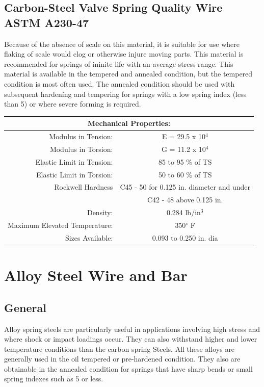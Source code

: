\documentclass[10pt]{article}
\begin{document}
\subsection{Carbon-Steel Valve Spring Quality Wire ASTM A230-47} %
Because of the absence of scale on this material, it is suitable for use where flaking of scale would clog or otherwise injure moving parts. 
This material is recommended for springs of ininite life with an average stress range. 
This material is available in the tempered and annealed condition, but the tempered condition is most often used. 
The annealed condition should be used with subsequent hardeníng and tempering for springs with a low spring index (less than 5) or where severe forming is required.

\begin{center}
\begin{tabular}{ r c }
\multicolumn{2}{c}{Mechanical Properties:} \\
\hline
Modulus in Tension: & E = 29.5 x 10$^4$ \\  
Modulus in Torsion: & G = 11.2 x 10$^4$ \\
Elastic Limit in Tension: & 85 to 95 \% of TS \\  
Elastic Limit in Torsion: & 50 to 60 \% of TS \\
Rockwell Hardness & C45 - 50 for 0.125 in. diameter and under\\
& C42 - 48 above 0.125 in.\\
Density: & 0.284 lb/in$^3$ \\
Maximum Elevated Temperature: & 350$^\circ$ F \\
Sizes Available: & 0.093 to 0.250 in. dia \\
\hline
\end{tabular}
\end{center}

\section{Alloy Steel Wire and Bar} %
\subsection{General} %
Alloy spring steels are particularly useful in applications involving high stress and where shock or impact loadings occur.
They can also withstand higher and lower temperature conditions than the carbon spring Steels. 
All these alloys are generally used in the oil tempered or pre-hardened condition. 
They also are obtainable in the annealed condition for springs that have sharp bends or small spring indexes such as 5 or less.
\end{document}
